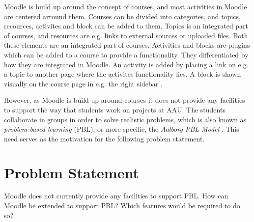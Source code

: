 Moodle is build up around the concept of courses, and most activities in Moodle are centered arround them. Courses can be divided into categories, and topics, recources, activites and block can be added to them. Topics is an integrated part of courses, and resources are e.g. links to external sources or uploaded files. Both these elements are an integrated part of courses. Activities and blocks are plugins which can be added to a course to provide a functionality. They differentiated by how they are integrated in Moodle. An activity is added by placing a link on e.g. a topic to another page where the activites functionality lies. A block is shown visually on the course page in e.g. the right sidebar .

However, as Moodle is build up around courses it does not provide any facilities to support the way that students work on projects at AAU. The students collaborate in groups in order to solve realistic problems, which is also known as \emph{problem-based learning} (PBL), or more specific, the \emph{Aalborg PBL Model} \citep{pbl}. This need serves as the motivation for the following problem statement.

\section{Problem Statement}
Moodle does not currently provide any facilities to support PBL. How can Moodle be extended to support PBL? Which features would be required to do so?